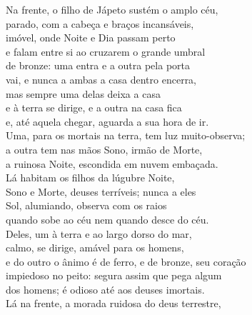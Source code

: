 \begin{pages}
\begin{Rightside}
\quad{}Na frente, o filho de Jápeto sustém o amplo céu,\\
parado, com a cabeça e braços incansáveis,\\
imóvel, onde Noite e Dia passam perto\\
e falam entre si ao cruzarem o grande umbral\\
de bronze: uma entra e a outra pela porta \\
vai, e nunca a ambas a casa dentro encerra,\\
mas sempre uma delas deixa a casa\\
e à terra se dirige, e a outra na casa fica\\
e, até aquela chegar, aguarda a sua hora de ir.\\
Uma, para os mortais na terra, tem luz muito-observa; \\
a outra tem nas mãos Sono, irmão de Morte,\\
a ruinosa Noite, escondida em nuvem embaçada.\\

\quad{}Lá habitam os filhos da lúgubre Noite,\\
Sono e Morte, deuses terríveis; nunca a eles\\
Sol, alumiando, observa com os raios \\
quando sobe ao céu nem quando desce do céu.\\
Deles, um à terra e ao largo dorso do mar,\\
calmo, se dirige, amável para os homens,\\
e do outro o ânimo é de ferro, e de bronze, seu coração\\
impiedoso no peito: segura assim que pega algum \\
dos homens; é odioso até aos deuses imortais.\\

\quad{}Lá na frente, a morada ruidosa do deus terrestre,\\
\\


\end{Rightside}
\end{pages}
